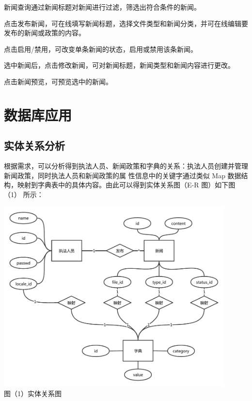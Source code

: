 \documentclass[a4paper, 12pt]{article}
\begin{document}
	\begin{enumerate} 
	{\setlength{\parskip}{-0.3em}
		\item 新闻查询通过新闻标题对新闻进行过滤，筛选出符合条件的新闻。
		\item 点击发布新闻，可在线填写新闻标题，选择文件类型和新闻分类，并可在线编辑要发布的新闻或政策的内容。
		\item 点击启用/禁用，可改变单条新闻的状态，启用或禁用该条新闻。
		\item 选中新闻后，点击修改新闻，可对新闻标题，新闻类型和新闻内容进行更改。
		\item 点击新闻预览，可预览选中的新闻。
	}
	\end{enumerate}

	\section{\Large\textbf 数据库应用}

	\subsection{\normalfont 实体关系分析}

	根据需求，可以分析得到执法人员、新闻政策和字典的关系：执法人员创建并管理新闻政策，同时执法人员和新闻政策的属
	性信息中的关键字通过类似 Map 数据结构，映射到字典表中的具体内容。由此可以得到实体关系图（E-R 图）如下图（1）
	所示：

	\begin{center}
		\includegraphics[width=12cm]{ER.pdf} \\
		\scriptsize 图（1）实体关系图
	\end{center}
\end{document}
